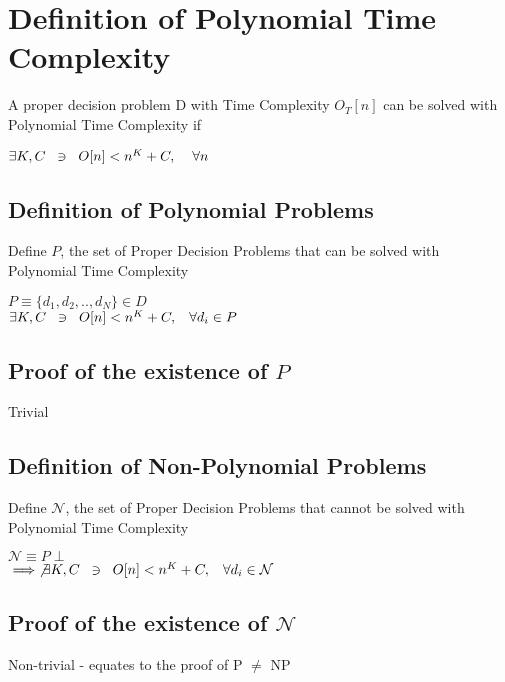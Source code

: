 \documentclass[11pt]{article}
\begin{document}
\section{Definition of Polynomial Time Complexity}
A proper decision problem D with Time Complexity $O_T[n]$ can be solved with Polynomial Time Complexity if
\begin{center}
$
\exists K,C \hspace{2mm} \ni \hspace{2mm} O[n] < n^K + C, \hspace{4mm} \forall n
$
\end{center}




\subsection{Definition of Polynomial Problems}
Define $P$, the set of Proper Decision Problems that can be solved with Polynomial Time Complexity
\begin{center}
$
P \equiv \{ d_1,d_2,..,d_N \} \in D
$\\
$ 
\exists K,C\hspace{2mm} \ni \hspace{2mm} O[n] < n^K + C, \hspace{3mm} \forall d_i \in P
$
\end{center}

\subsection{Proof of the existence of $P$}
Trivial

\subsection{Definition of Non-Polynomial Problems}
Define $\mathcal{N}$, the set of Proper Decision Problems that cannot be solved with Polynomial Time Complexity
\begin{center}
$
\mathcal{N} \equiv P\perp
$\\ \vspace{2mm}
$ 
\implies \not \exists K,C\hspace{2mm} \ni \hspace{2mm} O[n] < n^K + C, \hspace{3mm} \forall d_i \in \mathcal{N}
$
\end{center}

\subsection{Proof of the existence of $\mathcal{N}$}
Non-trivial - equates to the proof of P $\neq$ NP
\end{document}
